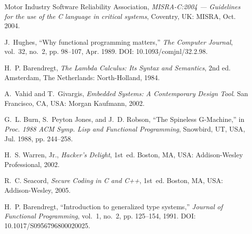 \documentclass[conference]{IEEEtran}
\begin{document}
\begin{thebibliography}{9}
Motor Industry Software Reliability Association, \emph{MISRA-C:2004 — Guidelines for the use of the C language in critical systems}, Coventry, UK: MISRA, Oct. 2004.

J.~Hughes, “Why functional programming matters,” \emph{The Computer Journal}, vol.~32, no.~2, pp. 98–107, Apr. 1989. DOI: 10.1093/comjnl/32.2.98.

H.~P. Barendregt, \emph{The Lambda Calculus: Its Syntax and Semantics}, 2nd ed. Amsterdam, The Netherlands: North-Holland, 1984.

A.~Vahid and T.~Givargis, \emph{Embedded Systems: A Contemporary Design Tool}. San Francisco, CA, USA: Morgan Kaufmann, 2002.

G.~L. Burn, S.~Peyton Jones, and J.~D. Robson, “The Spineless G-Machine,” in \emph{Proc. 1988 ACM Symp. Lisp and Functional Programming}, Snowbird, UT, USA, Jul. 1988, pp. 244–258.

H.~S. Warren, Jr., \emph{Hacker’s Delight}, 1st~ed. Boston, MA, USA: Addison-Wesley Professional, 2002.

R.~C. Seacord, \emph{Secure Coding in C and C++}, 1st~ed. Boston, MA, USA: Addison-Wesley, 2005.

H.~P. Barendregt, “Introduction to generalized type systems,” \emph{Journal of Functional Programming}, vol.~1, no.~2, pp. 125–154, 1991. DOI: 10.1017/S0956796800020025.

\end{thebibliography}
\end{document}
